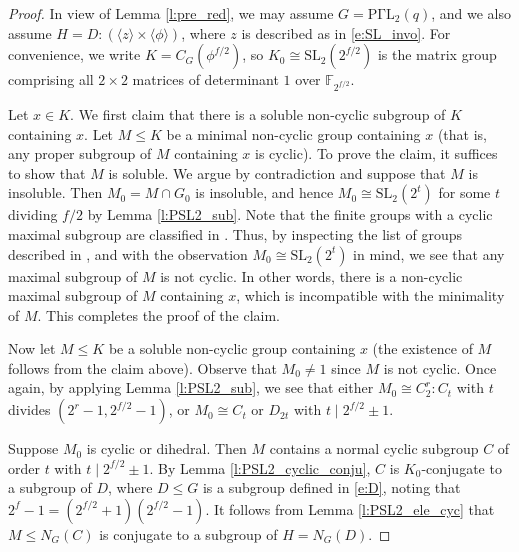 \documentclass[twoside,a4paper,reqno,11pt]{amsart}
\newcommand{\<}{\langle}
\renewcommand{\>}{\rangle}
\newcommand{\la}{\langle}
\newcommand{\ra}{\rangle}
\newcommand{\leqs}{\leqslant}
\newcommand{\SL}{\mathrm{SL}}
\newcommand{\PGammaL}{\mathrm{P\Gamma L}}
\theoremstyle{definition}
\begin{document}
	\begin{proof}
		In view of Lemma \ref{l:pre_red}, we may assume $G=\PGammaL_2(q)$,  and we also assume $H=D{:}(\la z \ra \times \la \phi \ra)$, where $z$ is described as in \eqref{e:SL_invo}. For convenience, we write $K=C_G(\phi^{f/2})$, so ${K}_0\cong \SL_2(2^{f/2})$ is the matrix group comprising all $2\times 2$ matrices of determinant $1$ over $\mathbb{F}_{2^{f/2}}$.
		
		Let $x\in K$. We first claim that there is a soluble non-cyclic subgroup of $K$ containing $x$.
		Let $M\leqs K$ be a minimal non-cyclic group containing $x$ (that is, any proper subgroup of $M$ containing $x$ is cyclic).
		To prove the claim, it suffices to show that $M$ is soluble.
		We argue by contradiction and suppose that $M$ is insoluble.
		Then $M_0 = M\cap G_0$ is insoluble, and hence $M_0\cong \SL_2(2^t)$ for some $t$ dividing $f/2$ by Lemma \ref{l:PSL2_sub}. Note that the finite groups with a cyclic maximal subgroup are classified in \cite[Theorem 1]{PK_max_cyclic}. Thus, by inspecting the list of groups described in \cite[Theorem 1]{PK_max_cyclic}, and with the observation $M_0\cong\SL_2(2^t)$ in mind, we see that any maximal subgroup of $M$ is not cyclic. In other words, there is a non-cyclic maximal subgroup of $M$ containing $x$, which is incompatible with the minimality of $M$. This completes the proof of the claim.
		
		Now let $M\leqs K$ be a soluble non-cyclic group containing $x$ (the existence of $M$ follows from the claim above).
		Observe that $M_0 \ne 1$ since $M$ is not cyclic. Once again, by applying Lemma \ref{l:PSL2_sub}, we see that either $M_0\cong C_2^r{:}C_t$ with $t$ divides $(2^r-1,2^{f/2}-1)$, or $M_0\cong C_t$ or $D_{2t}$ with $t\mid 2^{f/2}\pm 1$.
		
		Suppose $M_0$ is cyclic or dihedral. Then $M$ contains a normal cyclic subgroup $C$ of order $t$ with $t\mid 2^{f/2}\pm 1$.
		By Lemma \ref{l:PSL2_cyclic_conju}, $C$ is $K_0$-conjugate to a subgroup of $D$, where $D\leqs G$ is a subgroup defined in \eqref{e:D}, noting that $2^f-1 = (2^{f/2}+1)(2^{f/2}-1)$.
		It follows from Lemma \ref{l:PSL2_ele_cyc} that $M\leqslant N_G(C)$ is conjugate to a subgroup of $H=N_G(D)$.
		

\end{proof}
\end{document}
